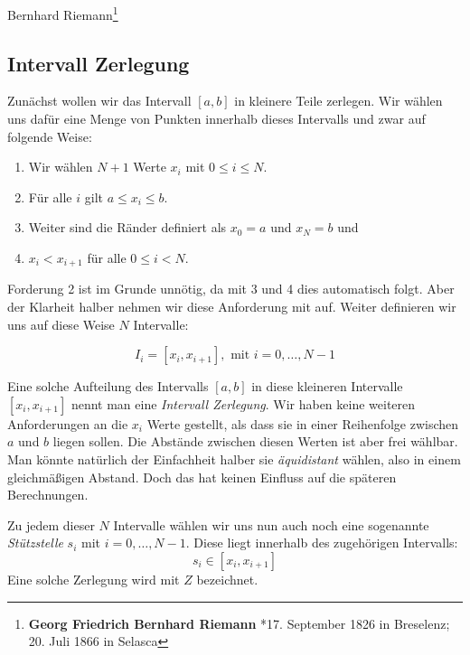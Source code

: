 Bernhard Riemann\footnote{\textbf{Georg Friedrich Bernhard Riemann} *17. September 1826 in Breselenz; 20. Juli 1866 in Selasca} 

\subsection{Intervall Zerlegung}

\begin{definition}
Zunächst wollen wir das Intervall $[a,b]$ in kleinere Teile zerlegen. Wir wählen uns dafür eine Menge von Punkten innerhalb dieses Intervalls und zwar auf folgende Weise:

\begin{enumerate}
\item Wir wählen $N+1$ Werte $x_i$ mit $0\le i \le N$.
\item Für alle $i$ gilt $a\le x_i \le b$.
\item Weiter sind die Ränder definiert als $x_0=a$ und $x_N=b$ und
\item $x_i < x_{i+1}$ für alle $0\le i < N$.
\end{enumerate}
Forderung 2 ist im Grunde unnötig, da mit 3 und 4 dies automatisch folgt. Aber der Klarheit halber nehmen wir diese Anforderung mit auf. Weiter definieren wir uns auf diese Weise $N$ Intervalle:

\begin{equation}
I_i = [x_i,x_{i+1}], \text{ mit } i=0, \dots , N-1
\end{equation}
\end{definition}

Eine solche Aufteilung des Intervalls $[a,b]$ in diese kleineren Intervalle $[x_i,x_{i+1}]$ nennt man eine \emph{Intervall Zerlegung}. Wir haben keine weiteren Anforderungen an die $x_i$ Werte gestellt, als dass sie in einer Reihenfolge zwischen $a$ und $b$ liegen sollen. Die Abstände zwischen diesen Werten ist aber frei wählbar. Man könnte natürlich der Einfachheit halber sie \emph{äquidistant} wählen, also in einem gleichmäßigen Abstand. Doch das hat keinen Einfluss auf die späteren Berechnungen. 

\begin{definition}
Zu jedem dieser $N$ Intervalle wählen wir uns nun auch noch eine sogenannte \emph{Stützstelle} $s_i$ mit $i=0, \dots , N-1$. Diese liegt innerhalb des zugehörigen Intervalls:
\begin{equation}
s_i \in [x_i,x_{i+1}]
\end{equation}
Eine solche Zerlegung wird mit $Z$ bezeichnet.
\end{definition}

